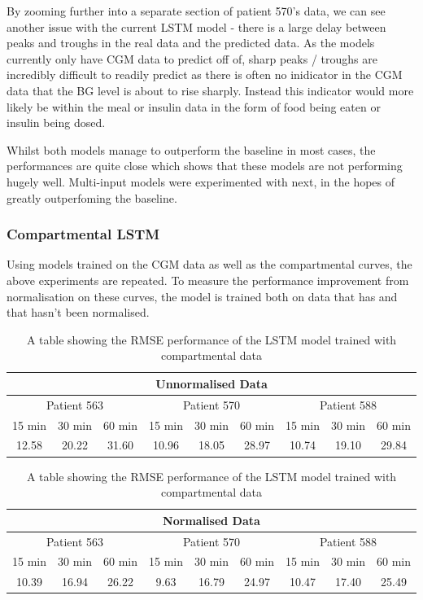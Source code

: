       By zooming further into a separate section of patient 570's data, we can see another issue with the current LSTM model - there is a large delay between peaks and troughs in the real data and the predicted data. As the models currently only have CGM data to predict off of, sharp peaks / troughs are incredibly difficult to readily predict as there is often no inidicator in the CGM data that the BG level is about to rise sharply. Instead this indicator would more likely be within the meal or insulin data in the form of food being eaten or insulin being dosed.

      Whilst both models manage to outperform the baseline in most cases, the performances are quite close which shows that these models are not performing hugely well. Multi-input models were experimented with next, in the hopes of greatly outperfoming the baseline.

    \subsubsection{Compartmental LSTM}

    Using models trained on the CGM data as well as the compartmental curves, the above experiments are repeated. To measure the performance improvement from normalisation on these curves, the model is trained both on data that has and that hasn't been normalised.

    \begin{table}[H]
      \centering
      \caption{A table showing the RMSE performance of the LSTM model trained with compartmental data}
      \begin{tabular}{|*{9}{c|}} 
        \hline
        \multicolumn{9}{|c|}{Unnormalised Data} \\ \hline
        \multicolumn{3}{|c}{Patient 563} & \multicolumn{3}{|c}{Patient 570} & \multicolumn{3}{|c|}{Patient 588} \\ \hline 
        15 min & 30 min & 60 min &15 min & 30 min & 60 min &15 min & 30 min & 60 min \\ \hline
        12.58&20.22 &31.60 &10.96 &18.05 & 28.97&10.74 &19.10 &29.84 \\ \hline
      \end{tabular}
      \begin{tabular}{|*{9}{c|}} 
        \hline
        \multicolumn{9}{|c|}{Normalised Data} \\ \hline
        \multicolumn{3}{|c}{Patient 563} & \multicolumn{3}{|c}{Patient 570} & \multicolumn{3}{|c|}{Patient 588} \\ \hline 
        15 min & 30 min & 60 min &15 min & 30 min & 60 min &15 min & 30 min & 60 min \\ \hline
        10.39 &16.94 &26.22 &9.63 &16.79 &24.97 &10.47 &17.40 &25.49 \\ \hline
      \end{tabular}
    \end{table}

